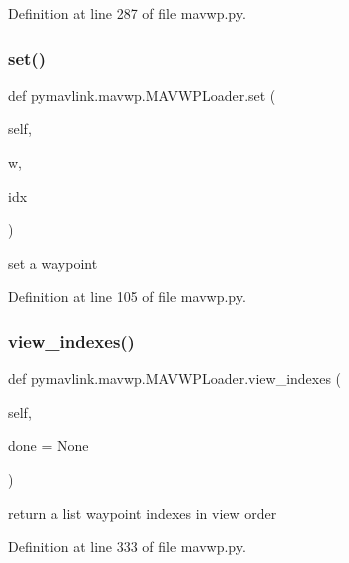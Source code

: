 Definition at line 287 of file mavwp.\+py.

\mbox{\label{classpymavlink_1_1mavwp_1_1MAVWPLoader_a7148099563199a32ccccb546115d4d24}} 
\subsubsection{\texorpdfstring{set()}{set()}}
{\footnotesize\ttfamily def pymavlink.\+mavwp.\+M\+A\+V\+W\+P\+Loader.\+set (\begin{DoxyParamCaption}\item[{}]{self,  }\item[{}]{w,  }\item[{}]{idx }\end{DoxyParamCaption})}

\begin{DoxyVerb}set a waypoint\end{DoxyVerb}
 

Definition at line 105 of file mavwp.\+py.

\mbox{\label{classpymavlink_1_1mavwp_1_1MAVWPLoader_a7ca25ea7f5367931e2be4b2d6fad3385}} 
\subsubsection{\texorpdfstring{view\_indexes()}{view\_indexes()}}
{\footnotesize\ttfamily def pymavlink.\+mavwp.\+M\+A\+V\+W\+P\+Loader.\+view\+\_\+indexes (\begin{DoxyParamCaption}\item[{}]{self,  }\item[{}]{done = {\ttfamily None} }\end{DoxyParamCaption})}

\begin{DoxyVerb}return a list waypoint indexes in view order\end{DoxyVerb}
 

Definition at line 333 of file mavwp.\+py.

\mbox{\label{classpymavlink_1_1mavwp_1_1MAVWPLoader_ad3554fb946d1618c0fa8d163a10473f0}} 

